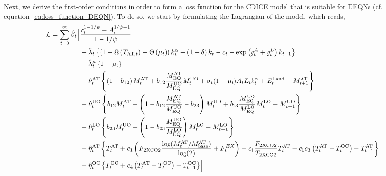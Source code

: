 \documentclass[11pt, a4paper, pdftex, twoside, dvipsnames]{article}
\begin{document}
\begin{appendices}
Next, we derive the first-order conditions in order to form a loss function for the CDICE model that is suitable for DEQNs (cf. equation~\eqref{eq:loss_function_DEQN}).
To do so, we start by formulating the Lagrangian of the model, which reads,
%
\begin{align}
 \label{eq:CDICE_lagrangian}
  \nonumber \mathcal{L} =
  \sum_{t=0}^{\infty}\hat{\beta}_t \Bigl[
  &\frac{c_{t}^{1-1/\psi}  -A_t^{1/\psi-1}}{1-1/\psi}
  \\
  \nonumber
  & + \hat{\lambda}_{t}\left\{\left(1 - \Omega\left(T_{\text{AT},t}\right) - \Theta\left(\mu_{t}\right)\right)k_{t}^{\alpha}
    + \left(1-\delta\right)k_{t}
    - c_{t} - \exp\left(g^{A}_{t}+g^{L}_{t}\right)k_{t+1}\right\}\\
%
  \nonumber
  & + \hat{\lambda}^{\mu}_{t}\left\{1-\mu_{t}\right\}\\
%
  \nonumber
    &+\hat{\nu}_t^{\text{AT}} \left\{\left(1 - b_{12} \right) M^{\text{AT}}_{t} + b_{12} \frac{M^{\text{AT}}_{\text{EQ}}}{M^{\text{UO}}_{\text{EQ}}} M^{\text{UO}}_{t} +   \sigma_t (1-\mu_t) A_{t}L_{t}k_{t}^{\alpha}  + E^{\text{Land}}_t - M^{\text{AT}}_{t+1}\right\} \\
  \nonumber
    &+\hat{\nu}_t^{\text{UO}} \left\{b_{12}M^{\text{AT}}_{t} + \left(1 - b_{12} \frac{M^{\text{AT}}_{\text{EQ}}}{M^{\text{UO}}_{\text{EQ}}} - b_{23}\right)M^{\text{UO}}_{t} + b_{23} \frac{M^{\text{UO}}_{\text{EQ}}}{M^{\text{LO}}_{\text{EQ}}} M^{\text{LO}}_{t} - M^{\text{UO}}_{t+1} \right\} \\
  \nonumber
    &+\hat{\nu}_t^{\text{LO}} \left\{b_{23}M^{\text{UO}}_{t} + \left(1 - b_{23} \frac{M^{\text{UO}}_{\text{EQ}}}{M^{\text{LO}}_{\text{EQ}}} \right)M^{\text{LO}}_{t} - M^{\text{LO}}_{t+1} \right\} \\
  \nonumber
    & + \hat{\eta}_t^{\text{AT}} \left\{ T^{\text{AT}}_{t} + c_1 \left(F_{\text{2XCO2}} \frac{\log(M^{\text{AT}}_{t}/M^{\text{AT}}_{\text{base}})}{\log(2)} + F^{EX}_{t} \right)  - c_1 \frac{F_{\text{2XCO2}}}{T_{\text{2XCO2}}}T^{\text{AT}}_{t}- c_1c_3 \left(T^{\text{AT}}_{t}-T^{\text{OC}}_{t}\right) - T^{\text{AT}}_{t+1} \right\} \\
    & + \hat{\eta}_t^{\text{OC}} \left\{ T^{\text{OC}}_{t} + c_4 \left(T^{\text{AT}}_{t}  - T^{\text{OC}}_{t}\right) - T^{\text{OC}}_{t+1} \right\} 
    \Bigr]
\end{align}
%


\end{appendices}
\end{document}
